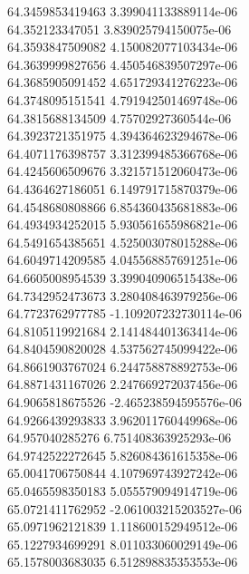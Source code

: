 {64.3459853419463 3.399041133889114e-06 \\
64.352123347051 3.839025794150075e-06 \\
64.3593847509082 4.150082077103434e-06 \\
64.3639999827656 4.450546839507297e-06 \\
64.3685905091452 4.651729341276223e-06 \\
64.3748095151541 4.791942501469748e-06 \\
64.3815688134509 4.75702927360544e-06 \\
64.3923721351975 4.394364623294678e-06 \\
64.4071176398757 3.312399485366768e-06 \\
64.4245606509676 3.321571512060473e-06 \\
64.4364627186051 6.149791715870379e-06 \\
64.4548680808866 6.854360435681883e-06 \\
64.4934934252015 5.930561655986821e-06 \\
64.5491654385651 4.525003078015288e-06 \\
64.6049714209585 4.045568857691251e-06 \\
64.6605008954539 3.399040906515438e-06 \\
64.7342952473673 3.280408463979256e-06 \\
64.7723762977785 -1.109207232730114e-06 \\
64.8105119921684 2.141484401363414e-06 \\
64.8404590820028 4.537562745099422e-06 \\
64.8661903767024 6.244758878892753e-06 \\
64.8871431167026 2.247669272037456e-06 \\
64.9065818675526 -2.465238594595576e-06 \\
64.9266439293833 3.962011760449968e-06 \\
64.957040285276 6.751408363925293e-06 \\
64.9742522272645 5.826084361615358e-06 \\
65.0041706750844 4.107969743927242e-06 \\
65.0465598350183 5.055579094914719e-06 \\
65.0721411762952 -2.061003215203527e-06 \\
65.0971962121839 1.118600152949512e-06 \\
65.1227934699291 8.011033060029149e-06 \\
65.1578003683035 6.512898835353553e-06 \\
}

